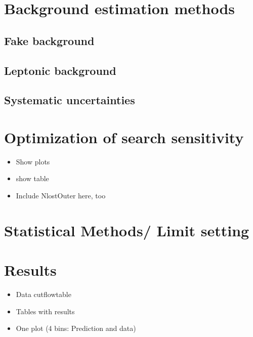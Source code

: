 \section{Background estimation methods}
\label{sec:BackgroundEstimation}
\subsection{Fake background}
\subsection{Leptonic background}
\subsection{Systematic uncertainties}

\section{Optimization of search sensitivity}
\label{sec:Optimization}
\begin{itemize}
\item Show plots
\item show table
\item Include NlostOuter here, too
\end{itemize}

\section{Statistical Methods/ Limit setting}
\label{sec:LimitSetting}

\section{Results}
\label{sec:Results}
\begin{itemize}
\item Data cutflowtable
\item Tables with results
\item One plot (4 bins: Prediction and data)
\end{itemize}

